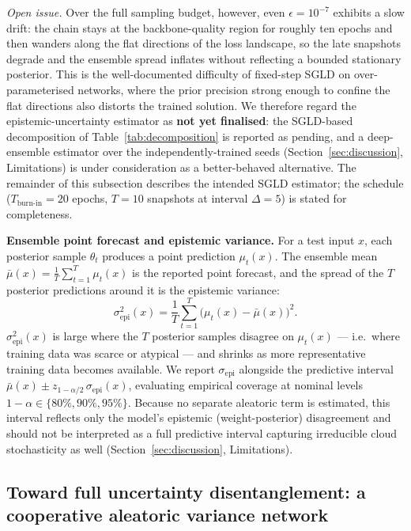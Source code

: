\emph{Open issue.} Over the full sampling budget, however, even
$\epsilon = 10^{-7}$ exhibits a slow drift: the chain stays at the
backbone-quality region for roughly ten epochs and then wanders along the
flat directions of the loss landscape, so the late snapshots degrade and the
ensemble spread inflates without reflecting a bounded stationary posterior.
This is the well-documented difficulty of fixed-step SGLD on
over-parameterised networks, where the prior precision strong enough to
confine the flat directions also distorts the trained solution. We therefore
regard the epistemic-uncertainty estimator as \textbf{not yet finalised}: the
SGLD-based decomposition of Table~\ref{tab:decomposition} is reported as
pending, and a deep-ensemble estimator over the independently-trained seeds
(Section~\ref{sec:discussion}, Limitations) is under consideration as a
better-behaved alternative. The remainder of this subsection describes the
intended SGLD estimator; the schedule ($T_\text{burn-in} = 20$ epochs,
$T = 10$ snapshots at interval $\Delta = 5$) is stated for completeness.

\textbf{Ensemble point forecast and epistemic variance.}
For a test input $x$, each posterior sample $\theta_t$ produces a point
prediction $\mu_t(x)$. The ensemble mean
$\bar\mu(x) = \frac{1}{T}\sum_{t=1}^T \mu_t(x)$ is the reported point
forecast, and the spread of the $T$ posterior predictions around it is the
epistemic variance:
\begin{equation}
  \sigma^2_\text{epi}(x) =
  \frac{1}{T}\sum_{t=1}^{T}\bigl(\mu_t(x)-\bar\mu(x)\bigr)^2.
  \label{eq:epistemic}
\end{equation}
$\sigma^2_\text{epi}(x)$ is large where the $T$ posterior samples disagree on
$\mu_t(x)$ --- i.e.\ where training data was scarce or atypical --- and
shrinks as more representative training data becomes available. We report
$\sigma_\text{epi}$ alongside the predictive interval
$\bar\mu(x) \pm z_{1-\alpha/2}\,\sigma_\text{epi}(x)$, evaluating empirical
coverage at nominal levels $1-\alpha \in \{80\%, 90\%, 95\%\}$. Because no
separate aleatoric term is estimated, this interval reflects only the
model's epistemic (weight-posterior) disagreement and should not be
interpreted as a full predictive interval capturing irreducible cloud
stochasticity as well (Section~\ref{sec:discussion}, Limitations).

\subsection{Toward full uncertainty disentanglement: a cooperative aleatoric
variance network}
\label{ssec:variance}

